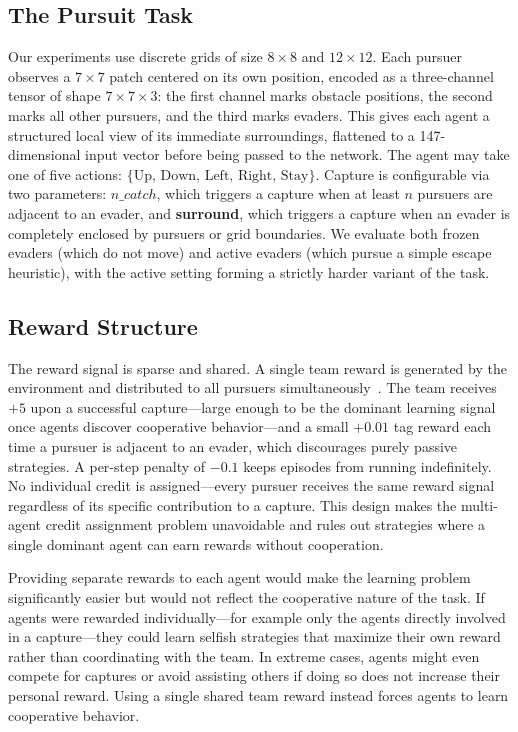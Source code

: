 \documentclass[sigconf,screen]{acmart}
\begin{document}
\subsection{The Pursuit Task}

Our experiments use discrete grids of size $8{\times}8$ and $12{\times}12$. Each pursuer observes a $7{\times}7$ patch centered on its own position, encoded as a three-channel tensor of shape $7{\times}7{\times}3$: the first channel marks obstacle positions, the second marks all other pursuers, and the third marks evaders. This gives each agent a structured local view of its immediate surroundings, flattened to a 147-dimensional input vector before being passed to the network. The agent may take one of five actions: $\{\text{Up, Down, Left, Right, Stay}\}$. Capture is configurable via two parameters: \textbf{$n\_catch$}, which triggers a capture when at least $n$ pursuers are adjacent to an evader, and \textbf{surround}, which triggers a capture when an evader is completely enclosed by pursuers or grid boundaries. We evaluate both frozen evaders (which do not move) and active evaders (which pursue a simple escape heuristic), with the active setting forming a strictly harder variant of the task.

\subsection{Reward Structure}

The reward signal is sparse and shared. A single team reward is generated by the environment and distributed to all pursuers simultaneously~\cite{terry2021pettingzoo}. The team receives $+5$ upon a successful capture---large enough to be the dominant learning signal once agents discover cooperative behavior---and a small $+0.01$ tag reward each time a pursuer is adjacent to an evader, which discourages purely passive strategies. A per-step penalty of $-0.1$ keeps episodes from running indefinitely. No individual credit is assigned—every pursuer receives the same reward signal regardless of its specific contribution to a capture. This design makes the multi-agent credit assignment problem unavoidable and rules out strategies where a single dominant agent can earn rewards without cooperation.

Providing separate rewards to each agent would make the learning problem significantly easier but would not reflect the cooperative nature of the task. If agents were rewarded individually—for example only the agents directly involved in a capture—they could learn selfish strategies that maximize their own reward rather than coordinating with the team. In extreme cases, agents might even compete for captures or avoid assisting others if doing so does not increase their personal reward. Using a single shared team reward instead forces agents to learn cooperative behavior. 
\end{document}
